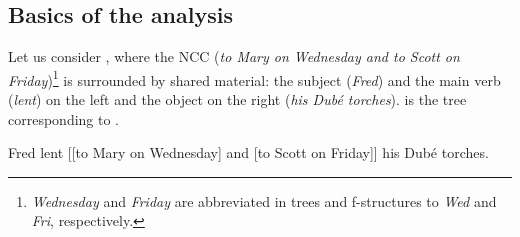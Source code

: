 \documentclass[output=paper]{../langscibook}
\begin{document}
\subsection{Basics of the \citet{max:man:96} analysis}
\label{sec:Coordination:NCC:basics}

Let us consider , where the NCC
 (\emph{to Mary on Wednesday and to Scott on
  Friday})\footnote{\emph{Wednesday} and \emph{Friday} are abbreviated
  in trees and f-structures to \emph{Wed} and \emph{Fri}, respectively.} is
surrounded by shared material: the subject (\emph{Fred}) and the main
verb (\emph{lent}) on the left and the object on the right (\emph{his
  Dubé torches}).  is the tree
corresponding to .

\ea\label{ex:max:man:96:15} Fred lent [[to Mary on Wednesday] and [to Scott on Friday]] his Dubé torches.\z
\end{document}
